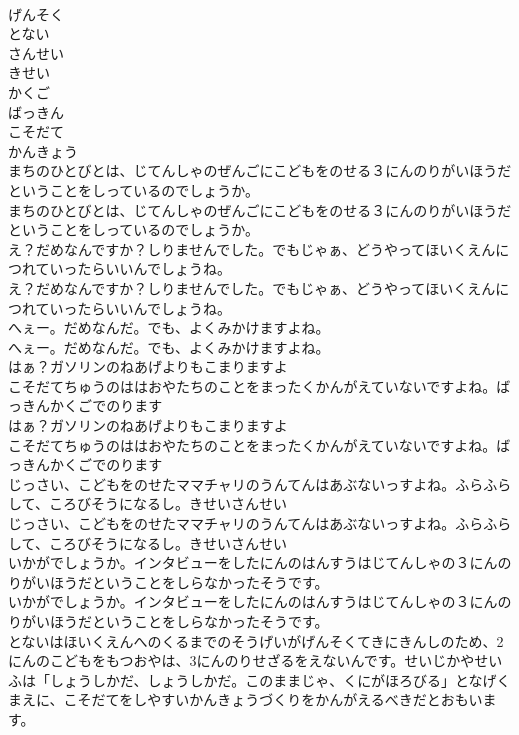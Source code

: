 \documentclass[8pt]{extreport}
\begin{document}
\begin{CJK}{UTF8}{min}
\\	げんそく
\\	とない
\\	さんせい
\\	きせい
\\	かくご
\\	ばっきん
\\	こそだて
\\	かんきょう
\\	まちのひとびとは、じてんしゃのぜんごにこどもをのせる３にんのりがいほうだということをしっているのでしょうか。
\\	まちのひとびとは、じてんしゃのぜんごにこどもをのせる３にんのりがいほうだということをしっているのでしょうか。
\\	え？だめなんですか？しりませんでした。でもじゃぁ、どうやってほいくえんにつれていったらいいんでしょうね。
\\	え？だめなんですか？しりませんでした。でもじゃぁ、どうやってほいくえんにつれていったらいいんでしょうね。
\\	へぇー。だめなんだ。でも、よくみかけますよね。
\\	へぇー。だめなんだ。でも、よくみかけますよね。
\\	はぁ？ガソリンのねあげよりもこまりますよ
\\	こそだてちゅうのははおやたちのことをまったくかんがえていないですよね。ばっきんかくごでのります
\\	はぁ？ガソリンのねあげよりもこまりますよ
\\	こそだてちゅうのははおやたちのことをまったくかんがえていないですよね。ばっきんかくごでのります
\\	じっさい、こどもをのせたママチャリのうんてんはあぶないっすよね。ふらふらして、ころびそうになるし。きせいさんせい
\\	じっさい、こどもをのせたママチャリのうんてんはあぶないっすよね。ふらふらして、ころびそうになるし。きせいさんせい
\\	いかがでしょうか。インタビューをしたにんのはんすうはじてんしゃの３にんのりがいほうだということをしらなかったそうです。
\\	いかがでしょうか。インタビューをしたにんのはんすうはじてんしゃの３にんのりがいほうだということをしらなかったそうです。
\\	とないはほいくえんへのくるまでのそうげいがげんそくてきにきんしのため、2にんのこどもをもつおやは、3にんのりせざるをえないんです。せいじかやせいふは「しょうしかだ、しょうしかだ。このままじゃ、くにがほろびる」となげくまえに、こそだてをしやすいかんきょうづくりをかんがえるべきだとおもいます。

\end{CJK}
\end{document}
